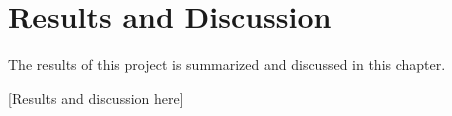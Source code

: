 \chapter{Results and Discussion}\label{chap:results}
\begin{overview}
  The results of this project is summarized and discussed in this chapter.
\end{overview}

[Results and discussion here]